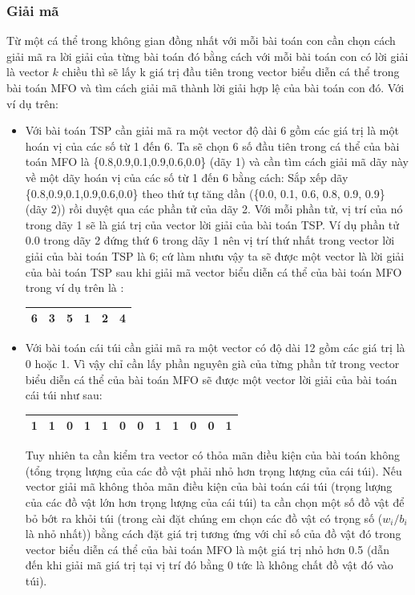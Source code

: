 \documentclass[a4paper,12pt]{report}
\begin{document}
\subsubsection{Giải mã}
Từ một cá thể trong không gian đồng nhất với mỗi bài toán con cần chọn cách giải mã ra lời giải của từng bài toán đó bằng cách với mỗi bài toán con có lời giải là vector $k$ chiều thì sẽ lấy k giá trị đầu tiên trong vector biểu diễn cá thể trong bài toán MFO và tìm cách giải mã thành lời giải hợp lệ của bài toán con đó. Với ví dụ trên: 
\begin{itemize}
\item Với bài toán TSP cần giải mã ra một vector độ dài 6 gồm các giá trị là một hoán vị của các số từ 1 đến 6. Ta sẽ chọn 6 số đầu tiên trong cá thể của bài toán MFO là \{0.8,0.9,0.1,0.9,0.6,0.0\} (dãy 1) và cần tìm cách giải mã dãy này về một dãy hoán vị của các số từ 1 đến 6 bằng cách: Sắp xếp dãy \{0.8,0.9,0.1,0.9,0.6,0.0\} theo thứ tự tăng dần (\{0.0, 0.1, 0.6, 0.8, 0.9, 0.9\} (dãy 2)) rồi duyệt qua các phần tử của dãy 2. Với mỗi phần tử, vị trí của nó trong dãy 1 sẽ là giá trị của vector lời giải của bài toán TSP. Ví dụ phần tử 0.0 trong dãy 2 đứng thứ 6 trong dãy 1 nên vị trí thứ nhất trong vector lời giải của bài toán TSP là 6; cứ làm nhưu vậy ta sẽ được một vector là lời giải của bài toán TSP sau khi giải mã vector biểu diễn cá thể của bài toán MFO trong ví dụ trên là :
\begin{longtable}{|c|c|c|c|c|c|}
\hline
6& 3& 5& 1& 2& 4\\
\hline
\end{longtable}

\item Với bài toán cái túi cần giải mã ra một vector có độ dài 12 gồm các giá trị là 0 hoặc 1. Vì vậy chỉ cần lấy phần nguyên già của từng phần tử trong vector biểu diễn cá thể của bài toán MFO sẽ được một vector lời giải của bài toán cái túi như sau:
\begin{longtable}{|c|c|c|c|c|c|c|c|c|c|c|c|}
\hline
1& 1& 0& 1& 1& 0&0&1&1&0&0&1\\
\hline
\end{longtable}
Tuy nhiên ta cần kiểm tra vector có thỏa mãn điều kiện của bài toán không (tổng trọng lượng của các đồ vật phải nhỏ hơn trọng lượng của cái túi). Nếu vector giải mã không thỏa mãn điều kiện của bài toán cái túi (trọng lượng của các đồ vật lớn hơn trọng lượng của cái túi) ta cần chọn một số đồ vật để bỏ bớt ra khỏi túi (trong cài đặt chúng em chọn các đồ vật có trọng số ($w_i/b_i$ là nhỏ nhất)) bằng cách đặt giá trị tương ứng với chỉ số của đồ vật đó trong vector biểu diễn cá thể của bài toán MFO là một giá trị nhỏ hơn 0.5 (dẫn đến khi giải mã giá trị tại vị trí đó bằng 0 tức là không chất đồ vật đó vào túi).  
\end{itemize}
\end{document}
